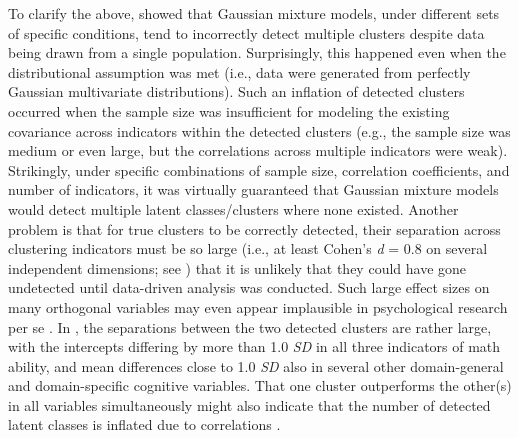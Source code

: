 \documentclass[letterpaper,11pt]{article}
\begin{document}
To clarify the above,  showed that Gaussian mixture models, under different sets of specific conditions, tend to incorrectly detect multiple clusters despite data being drawn from a single population. Surprisingly, this happened even when the distributional assumption was met (i.e., data were generated from perfectly Gaussian multivariate distributions). Such an inflation of detected clusters occurred when the sample size was insufficient for modeling the existing covariance across indicators within the detected clusters (e.g., the sample size was medium or even large, but the correlations across multiple indicators were weak). Strikingly, under specific combinations of sample size, correlation coefficients, and number of indicators, it was virtually guaranteed that Gaussian mixture models would detect multiple latent classes/clusters where none existed. Another problem is that for true clusters to be correctly detected, their separation across clustering indicators must be so large (i.e., at least Cohen’s \textit{d} = 0.8 on several independent dimensions; see ) that it is unlikely that they could have gone undetected until data-driven analysis was conducted. Such large effect sizes on many orthogonal variables may even appear implausible in psychological research per se \cite{toffalini2022entia}. In , the separations between the two detected clusters are rather large, with the intercepts differing by more than 1.0 \textit{SD} in all three indicators of math ability, and mean differences close to 1.0 \textit{SD} also in several other domain-general and domain-specific cognitive variables. That one cluster outperforms the other(s) in all variables simultaneously might also indicate that the number of detected latent classes is inflated due to correlations \cite{toffalini2022entia}. 
\end{document}
